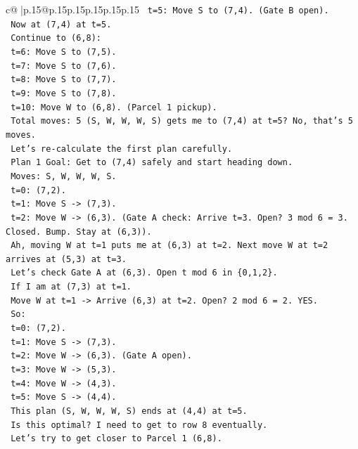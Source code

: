 \documentclass{article}
\begin{document}
{\begin{supertabular}{c@{$\;$}|p{.15\linewidth}@{}p{.15\linewidth}p{.15\linewidth}p{.15\linewidth}p{.15\linewidth}p{.15\linewidth}}
{{{\texttt{    t=5: Move S to (7,4). (Gate B open).} \\
\texttt{    Now at (7,4) at t=5.} \\
\texttt{    Continue to (6,8):} \\
\texttt{    t=6: Move S to (7,5).} \\
\texttt{    t=7: Move S to (7,6).} \\
\texttt{    t=8: Move S to (7,7).} \\
\texttt{    t=9: Move S to (7,8).} \\
\texttt{    t=10: Move W to (6,8). (Parcel 1 pickup).} \\
\texttt{    Total moves: 5 (S, W, W, W, S) gets me to (7,4) at t=5? No, that's 5 moves.} \\
\texttt{    Let's re{-}calculate the first plan carefully.} \\
\texttt{    Plan 1 Goal: Get to (7,4) safely and start heading down.} \\
\texttt{    Moves: S, W, W, W, S.} \\
\texttt{    t=0: (7,2).} \\
\texttt{    t=1: Move S {-}> (7,3).} \\
\texttt{    t=2: Move W {-}> (6,3). (Gate A check: Arrive t=3. Open? 3 mod 6 = 3. Closed. Bump. Stay at (6,3)).} \\
\texttt{    Ah, moving W at t=1 puts me at (6,3) at t=2. Next move W at t=2 arrives at (5,3) at t=3.} \\
\texttt{    Let's check Gate A at (6,3). Open t mod 6 in \{0,1,2\}.} \\
\texttt{    If I am at (7,3) at t=1.} \\
\texttt{    Move W at t=1 {-}> Arrive (6,3) at t=2. Open? 2 mod 6 = 2. YES.} \\
\texttt{    So:} \\
\texttt{    t=0: (7,2).} \\
\texttt{    t=1: Move S {-}> (7,3).} \\
\texttt{    t=2: Move W {-}> (6,3). (Gate A open).} \\
\texttt{    t=3: Move W {-}> (5,3).} \\
\texttt{    t=4: Move W {-}> (4,3).} \\
\texttt{    t=5: Move S {-}> (4,4).} \\
\texttt{    This plan (S, W, W, W, S) ends at (4,4) at t=5.} \\
\texttt{    Is this optimal? I need to get to row 8 eventually.} \\
\texttt{    Let's try to get closer to Parcel 1 (6,8).} \\
}}}
\end{supertabular}}
\end{document}
